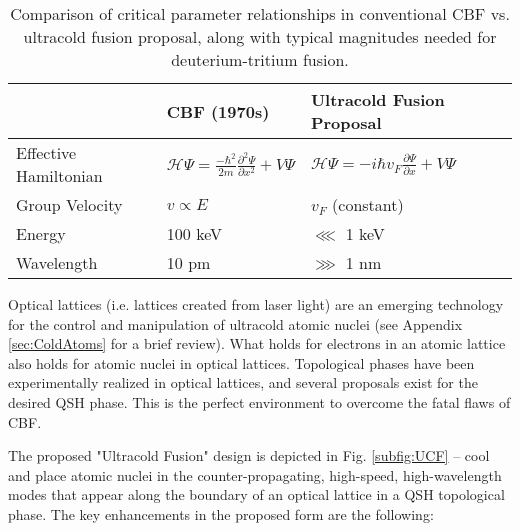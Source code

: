 \documentclass[onecolumn,
               superscriptaddress,
               floatfix,
               longbibliography, 
               showkeys,apl]{revtex4-2}
\begin{document}
\begin{table}[h!]
\centering
\begin{tabular}{|M||M|M|}
 \hline
 &CBF (1970s)&Ultracold Fusion Proposal\\
 \hline
 Effective Hamiltonian&$\mathcal{H} \Psi = \frac{-\hbar^2}{2m}\frac{\partial^2 \Psi}{\partial x^2}+V\Psi$&$\mathcal{H}\Psi=-i\hbar v_F\frac{\partial \Psi}{\partial x}+V\Psi$\\
 \hline
 Group Velocity&$v\propto E$&$v_F$ (constant)\\
 \hline
 \hline
 Energy&100 keV&$\lll$ 1 keV\\
 \hline
 Wavelength&10 pm&$\ggg$ 1 nm\\
 \hline
\end{tabular}
\caption{Comparison of critical parameter relationships in conventional CBF vs. ultracold fusion proposal, along with typical magnitudes needed for deuterium-tritium fusion.}
\label{tab:dispersion}
\end{table}

Optical lattices (i.e. lattices created from laser light) are an emerging technology for the control and manipulation of ultracold atomic nuclei (see Appendix \ref{sec:ColdAtoms} for a brief review). What holds for electrons in an atomic lattice also holds for atomic nuclei in optical lattices. Topological phases have been experimentally realized in optical lattices, and several proposals exist for the desired QSH phase. This is the perfect environment to overcome the fatal flaws of CBF. 

The proposed "Ultracold Fusion" design is depicted in Fig. \ref{subfig:UCF} -- cool and place atomic nuclei in the counter-propagating, high-speed, high-wavelength modes that appear along the boundary of an optical lattice in a QSH topological phase. The key enhancements in the proposed form are the following:
\end{document}
